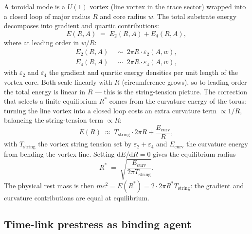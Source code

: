 A toroidal mode is a $U(1)$ vortex (line vortex in the trace sector) wrapped into a closed loop
of major radius $R$ and core radius $w$.
The total substrate energy decomposes into gradient and quartic contributions:
\begin{equation}
  E(R,A)
  \;=\; E_2(R,A) + E_4(R,A),
  \label{eq:torus-energy}
\end{equation}
where at leading order in $w/R$:
\begin{align}
  E_2(R,A) &\;\sim\; 2\pi R \cdot \varepsilon_2(A,w),
  \label{eq:torus-E2}\\
  E_4(R,A) &\;\sim\; 2\pi R \cdot \varepsilon_4(A,w),
  \label{eq:torus-E4}
\end{align}
with $\varepsilon_2$ and $\varepsilon_4$ the gradient and quartic energy densities per unit length
of the vortex core.
Both scale linearly with $R$ (circumference grows), so to leading order the total energy is linear
in $R$ --- this is the string-tension picture.
The correction that selects a finite equilibrium $R^*$ comes from the curvature energy of the
torus: turning the line vortex into a closed loop costs an extra curvature term $\propto 1/R$,
balancing the string-tension term $\propto R$:
\begin{equation}
  E(R) \;\approx\; T_{\mathrm{string}}\cdot 2\pi R + \frac{E_{\mathrm{curv}}}{R},
  \label{eq:torus-balance}
\end{equation}
with $T_{\mathrm{string}}$ the vortex string tension set by $\varepsilon_2+\varepsilon_4$ and
$E_{\mathrm{curv}}$ the curvature energy from bending the vortex line.
Setting $\mathrm{d}E/\mathrm{d}R=0$ gives the equilibrium radius
\begin{equation}
  R^* \;=\; \sqrt{\frac{E_{\mathrm{curv}}}{2\pi T_{\mathrm{string}}}}.
  \label{eq:torus-radius}
\end{equation}
The physical rest mass is then $mc^2 = E(R^*) = 2\cdot 2\pi R^* T_{\mathrm{string}}$:
the gradient and curvature contributions are equal at equilibrium.

\subsection{Time-link prestress as binding agent}
\label{subsec:time-link-binding}

